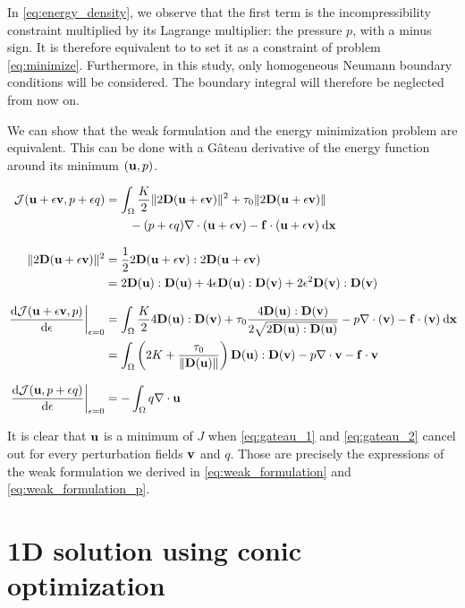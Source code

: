 \documentclass[11 pt]{report}
\begin{document}
In \cref{eq:energy_density}, we observe that the first term is the incompressibility constraint multiplied by its Lagrange multiplier: the pressure $p$, with a minus sign. It is therefore equivalent to to set it as a constraint of problem \eqref{eq:minimize}. Furthermore, in this study, only homogeneous Neumann boundary conditions will be considered. The boundary integral will therefore be neglected from now on.

We can show that the weak formulation and the energy minimization problem are equivalent. This can be done with a Gâteau derivative of the energy function around its minimum $(\mathbf{u}, p)$.

\begin{align}
    \mathcal{J}(\mathbf{u} + \epsilon \mathbf{v}, p+\epsilon q) &= \int_{\Omega} \frac{K}{2} \|2\mathbf{D}(\mathbf{u} + \epsilon \mathbf{v})\|^2 + \tau_0  \|2\mathbf{D}(\mathbf{u} + \epsilon \mathbf{v})\| \\
    &\qquad - (p + \epsilon q) \nabla \cdot (\mathbf{u} + \epsilon \mathbf{v}) - \mathbf{f}\cdot(\mathbf{u} + \epsilon \mathbf{v}) \: \dd \mathbf{x}\\[8pt]
    \|2\mathbf{D}(\mathbf{u} + \epsilon \mathbf{v})\|^2 &= \frac{1}{2} 2\mathbf{D}(\mathbf{u} + \epsilon \mathbf{v}) : 2\mathbf{D}(\mathbf{u} + \epsilon \mathbf{v}) \nonumber \\
    &= 2 \mathbf{D}(\mathbf{u}):\mathbf{D}(\mathbf{u}) + 4\epsilon \mathbf{D}(\mathbf{u}):\mathbf{D}(\mathbf{v}) + 2\epsilon^2 \mathbf{D}(\mathbf{v}):\mathbf{D}(\mathbf{v})\\[8pt]
    \left. \dv{\mathcal{J}(\mathbf{u}+ \epsilon \mathbf{v}, p)}{\epsilon}\right\vert_{\epsilon=0} &= \int_{\Omega} \frac{K}{2}   4\mathbf{D}(\mathbf{u}):\mathbf{D}(\mathbf{v}) + \tau_0 \frac{4\mathbf{D}(\mathbf{u}):\mathbf{D}(\mathbf{v})}{2\sqrt{2\mathbf{D}(\mathbf{u}):\mathbf{D}(\mathbf{u})}} - p\nabla\cdot(\mathbf{v}) - \mathbf{f}\cdot(\mathbf{v}) \: \dd \mathbf{x}\nonumber\\
    &= \int_{\Omega} \left(2K + \frac{\tau_0}{\|\mathbf{D}(\mathbf{u})\|}\right) \mathbf{D}(\mathbf{u}):\mathbf{D}(\mathbf{v}) - p\nabla\cdot \mathbf{v} - \mathbf{f} \cdot \mathbf{v} \label{eq:gateau_1} \\[8pt]
    \left. \dv{\mathcal{J}(\mathbf{u}, p+\epsilon q)}{\epsilon}\right\vert_{\epsilon=0} &= -\int_{\Omega}q \nabla \cdot \mathbf{u}  \label{eq:gateau_2}
\end{align}

It is clear that $\mathbf{u}$ is a minimum of $J$ when \eqref{eq:gateau_1} and \eqref{eq:gateau_2} cancel out for every perturbation fields $\mathbf{v}$ and $q$. Those are precisely the expressions of the weak formulation we derived in \eqref{eq:weak_formulation} and \eqref{eq:weak_formulation_p}.


\chapter{1D solution using conic optimization}
\label{chap:chap1}
\end{document}
